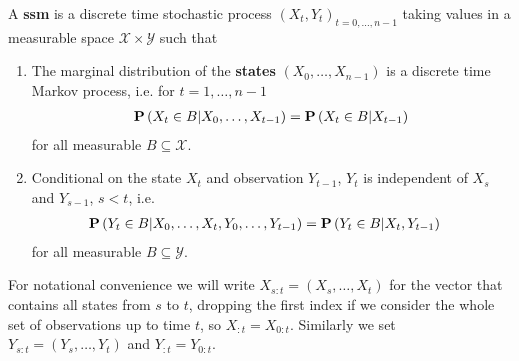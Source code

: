 \begin{definition}
    \label{def:ssm}
    A \textbf{\gls{ssm}} is a discrete time stochastic process $(X_t, Y_t)_{t=0, \dots, n -1}$ taking values in a measurable space $\mathcal X \times \mathcal Y$ such that
    \begin{enumerate}
        \item The marginal distribution of the \textbf{states} $(X_0, \dots, X_{n - 1})$ is a discrete time Markov process, i.e. for $t = 1, \dots, n-1$
              \begin{align}
                  \label{eq:markov_property}
                  \P \left( X_{t} \in B \middle| X_0, \dots, X_{t - 1} \right) = \P \left( X_{t} \in B \middle| X_{t - 1} \right)
              \end{align}
              for all measurable $B \subseteq \mathcal X$.
        \item Conditional on the state $X_t$ and observation $Y_{t - 1}$, $Y_t$ is independent of $X_s$ and $Y_{s - 1}$, $s < t$, i.e.
              \begin{align*}
                  \P \left( Y_{t} \in B \middle| X_{0}, \dots, X_{t}, Y_{0}, \dots, Y_{t - 1} \right) & = \P \left( Y_{t} \in B | X_{t}, Y_{t - 1} \right)
              \end{align*}
              for all measurable $B \subseteq \mathcal{Y}$.
    \end{enumerate}
\end{definition}

For notational convenience we will write $X_{s:t} = \left(X_s, \dots, X_{t}\right)$ for the vector that contains all states from $s$ to $t$, dropping the first index if we consider the whole set of observations up to time $t$, so $X_{:t} = X_{0:t}$.
Similarly we set $Y_{s:t} = \left(Y_s, \dots, Y_{t}\right)$ and $Y_{:t} = Y_{0:t}$.


